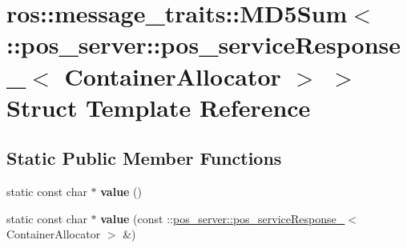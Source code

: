 \hypertarget{structros_1_1message__traits_1_1MD5Sum_3_01_1_1pos__server_1_1pos__serviceResponse___3_01ContainerAllocator_01_4_01_4}{}\section{ros\+:\+:message\+\_\+traits\+:\+:M\+D5\+Sum$<$ \+:\+:pos\+\_\+server\+:\+:pos\+\_\+service\+Response\+\_\+$<$ Container\+Allocator $>$ $>$ Struct Template Reference}
\label{structros_1_1message__traits_1_1MD5Sum_3_01_1_1pos__server_1_1pos__serviceResponse___3_01ContainerAllocator_01_4_01_4}
\subsection*{Static Public Member Functions}
\begin{DoxyCompactItemize}
\item 
\mbox{\label{structros_1_1message__traits_1_1MD5Sum_3_01_1_1pos__server_1_1pos__serviceResponse___3_01ContainerAllocator_01_4_01_4_a60c643838e93d8ee7606fbc2ecb9f58b}} 
static const char $\ast$ {\bfseries value} ()
\item 
\mbox{\label{structros_1_1message__traits_1_1MD5Sum_3_01_1_1pos__server_1_1pos__serviceResponse___3_01ContainerAllocator_01_4_01_4_ad0e42adf09c55ee109e20ff88414da12}} 
static const char $\ast$ {\bfseries value} (const \+::\hyperlink{structpos__server_1_1pos__serviceResponse__}{pos\+\_\+server\+::pos\+\_\+service\+Response\+\_\+}$<$ Container\+Allocator $>$ \&)
\end{DoxyCompactItemize}
